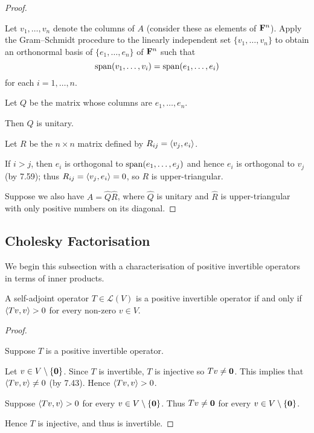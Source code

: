 \begin{proof} \

 Let $v_1,\dots,v_n$ denote the columns of $A$ (consider these as elements of $\mathbf F^n$). Apply the Gram--Schmidt procedure to the linearly independent set $\{v_1,\dots,v_n\}$ to obtain an orthonormal basis of $\{e_1,\dots,e_n\}$ of $\mathbf F^n$ such that
\[\operatorname{span}(v_1,\dots,v_i)=\operatorname{span}(e_1,\dots,e_i)\]
for each $i=1,\dots,n$.

\begin{claim}
Let $Q$ be the matrix whose columns are $e_1,\dots,e_n$.
\end{claim}

Then $Q$ is unitary.

\begin{claim}
Let $R$ be the $n\times n$ matrix defined by $R_{ij}=\left\langle v_j,e_i\right\rangle$.
\end{claim}

If $i>j$, then $e_i$ is orthogonal to $\operatorname{span}(e_1,\dots,e_j)$ and hence $e_i$ is orthogonal to $v_j$ (by 7.59); thus $R_{ij}=\left\langle v_j,e_i\right\rangle=0$, so $R$ is upper-triangular.



 Suppose we also have $A=\hat{Q}\hat{R}$, where $\hat{Q}$ is unitary and $\hat{R}$ is upper-triangular with only positive numbers on its diagonal. 
\end{proof}
\pagebreak

\subsection{Cholesky Factorisation}
We begin this subsection with a characterisation of positive invertible operators in terms of inner products.

\begin{lemma}
A self-adjoint operator $T\in\mathcal{L}(V)$ is a positive invertible operator if and only if $\left\langle Tv,v\right\rangle>0$ for every non-zero $v\in V$.
\end{lemma}

\begin{proof} \

\forward Suppose $T$ is a positive invertible operator. 

Let $v\in V\setminus\{\vb{0}\}$. Since $T$ is invertible, $T$ is injective so $Tv\neq\vb{0}$. This implies that $\left\langle Tv,v\right\rangle\neq0$ (by 7.43). Hence $\left\langle Tv,v\right\rangle>0$.

\backward Suppose $\left\langle Tv,v\right\rangle>0$ for every $v\in V\setminus\{\vb{0}\}$. Thus $Tv\neq\vb{0}$ for every $v\in V\setminus\{\vb{0}\}$.

Hence $T$ is injective, and thus is invertible.
\end{proof}

